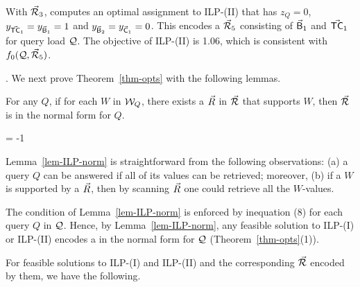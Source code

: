 \begin{example}\label{exa-ILP-II}
With $\vec{{\mathcal R}}_{3}$, \opts computes an optimal assignment to
ILP-(II) that has $z_{Q} = 0$, %
$y_{\vec{\protect\mathsf{TC}}_{1}} = y_{\vec{\protect\mathsf{B}}_{1}} = 1$ and
$y_{\vec{\protect\mathsf{B}}_{2}} = y_{\vec{\protect\mathsf{C}}_{1}} = 0$. %
This encodes a
\bds $\vec{{\mathcal R}}_{5}$ consisting of $\vec{\protect\mathsf{B}}_{1}$ and
$\vec{\protect\mathsf{TC}}_{1}$ for query load $\mathcal Q$. %
The objective of ILP-(II) %
is 1.06, which is
consistent with $f_{0}(\mathcal Q,
\vec{{\mathcal R}}_{5})$. 
\end{example}

\vspace{-0.4ex}

. We next prove Theorem~\ref{thm-opts} with the following lemmas. 



\begin{lemma}\label{lem-ILP-norm}
  For any \SQL $Q$, if for each \qcs $W$ in $\mathcal{W}_{Q}$, there
  exists a \bs $\vec{R}$ in $\vec{{\mathcal R}}$ that supports $W$, then
  $\vec{{\mathcal R}}$ is in the normal form for $Q$.
\end{lemma}
\looseness = -1

Lemma~\ref{lem-ILP-norm} is straightforward from the following observations:
(a) a query $Q$ can be answered if all of its \qcs values can be
retrieved; moreover,
(b) if a \qcs $W$ is supported by a \bs $\vec{R}$, then by scanning
$\vec{R}$ one could retrieve all the $W$-values. 

The condition of Lemma~\ref{lem-ILP-norm} is enforced
by inequation (8) for each query $Q$ in $\mathcal Q$.
Hence, by Lemma~\ref{lem-ILP-norm}, any feasible solution to ILP-(I)
or ILP-(II) %
encodes a \bds %
in the normal form for $\mathcal Q$
(Theorem~\ref{thm-opts}(1)). 


\vspace{1ex}
For feasible solutions to ILP-(I) and ILP-(II) and the
corresponding \bdss $\vec{{\mathcal R}}$ encoded by them,
we have the following.

